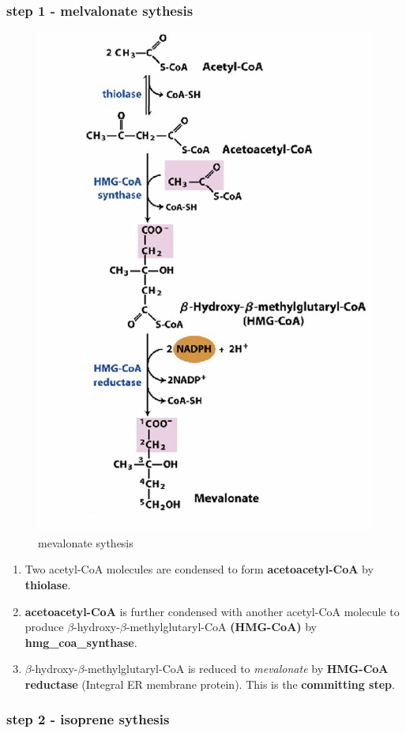 \documentclass[../main.tex]{subfiles}
\begin{document}
\subsubsection{step 1 - melvalonate sythesis}
\begin{figure}[H]
    \centering
    \includegraphics[width=0.5\linewidth]{melvalonateSythesis.png}
    \caption{\gls{mevalonate} sythesis}
    \label{fig:enter-label}
\end{figure}
\begin{enumerate}
    \item Two acetyl-CoA molecules are condensed to form \textbf{acetoacetyl-CoA} by \textbf{\gls{thiolase}}.
    
    \item \textbf{\gls{acetoacetyl}-CoA} is further condensed with another acetyl-CoA molecule to produce $\beta$-hydroxy-$\beta$-methylglutaryl-CoA \textbf{(HMG-CoA)} by \textbf{\gls{hmg_coa_synthase}}.
    
    \item $\beta$-hydroxy-$\beta$-methylglutaryl-CoA is reduced to \textit{mevalonate} by \textbf{HMG-CoA reductase} (Integral ER membrane protein). This is the \textbf{committing step}.
\end{enumerate}


\subsubsection{step 2 - isoprene sythesis}
\end{document}
